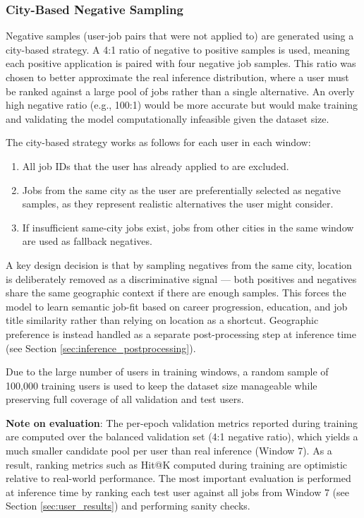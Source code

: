\subsubsection{City-Based Negative Sampling}
\label{sec:negative_sampling}

Negative samples (user-job pairs that were not applied to) are generated using a city-based strategy. A 4:1 ratio of negative to positive samples is used, meaning each positive application is paired with four negative job samples. This ratio was chosen to better approximate the real inference distribution, where a user must be ranked against a large pool of jobs rather than a single alternative. An overly high negative ratio (e.g., 100:1) would be more accurate but would make training and validating the model computationally infeasible given the dataset size.

The city-based strategy works as follows for each user in each window:
\begin{enumerate}
    \item All job IDs that the user has already applied to are excluded.
    \item Jobs from the same city as the user are preferentially selected as negative samples, as they represent realistic alternatives the user might consider.
    \item If insufficient same-city jobs exist, jobs from other cities in the same window are used as fallback negatives.
\end{enumerate}

A key design decision is that by sampling negatives from the same city, location is deliberately removed as a discriminative signal — both positives and negatives share the same geographic context if there are enough samples. This forces the model to learn semantic job-fit based on career progression, education, and job title similarity rather than relying on location as a shortcut. Geographic preference is instead handled as a separate post-processing step at inference time (see Section \ref{sec:inference_postprocessing}).

Due to the large number of users in training windows, a random sample of 100,000 training users is used to keep the dataset size manageable while preserving full coverage of all validation and test users.

\noindent\textbf{Note on evaluation}: The per-epoch validation metrics reported during training are computed over the balanced validation set (4:1 negative ratio), which yields a much smaller candidate pool per user than real inference (Window 7). As a result, ranking metrics such as Hit@K computed during training are optimistic relative to real-world performance. The most important evaluation is performed at inference time by ranking each test user against all jobs from Window 7 (see Section \ref{sec:user_results}) and performing sanity checks.

